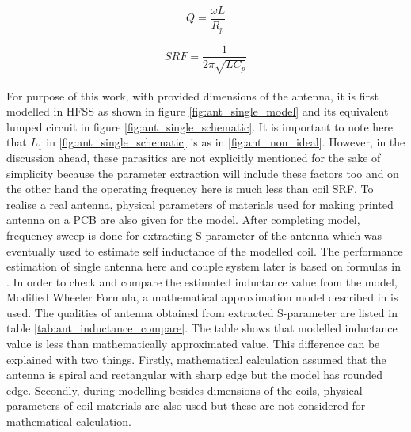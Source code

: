 \documentclass[12pt,a4paper,UKenglish]{report}
\begin{document}
\begin{equation} \label{eq:quality_f} %
Q = \frac {\omega L}{R_{p}}
\end{equation}

\begin{equation} \label{eq:srf}	%
SRF = \frac{1} {2\pi\sqrt{LC_{p}}}
\end{equation}\\

For purpose of this work, with provided dimensions of the antenna, it is first modelled in HFSS as shown in 
figure \ref{fig:ant_single_model} and its equivalent lumped circuit in figure \ref{fig:ant_single_schematic}. 
It is important to note here that $L_{1}$ in \ref{fig:ant_single_schematic} is as in \ref{fig:ant_non_ideal}. However, in the discussion ahead, these 
parasitics are not explicitly mentioned for the sake of simplicity because the parameter extraction will include these factors too and on the other hand the operating frequency here is much less than coil SRF. To realise a real antenna, physical parameters of materials used for making 
printed antenna on a PCB are also given for the model.  After completing model, frequency sweep is done for extracting S parameter of the 
antenna which was eventually used to estimate  self inductance of the modelled coil. The performance estimation of 
single antenna here and couple system later is based on formulas in \cite{ant_SZ_formula}. In order to check and compare the estimated inductance value from 
the model, Modified Wheeler Formula, a mathematical approximation model described in \cite{ant_inductance_calculation} is used. The 
qualities of antenna obtained from extracted S-parameter are listed in table \ref{tab:ant_inductance_compare}. The table shows that 
modelled inductance value is less than mathematically approximated value. This difference can be explained with two things. 
Firstly, mathematical calculation assumed that the antenna is spiral and rectangular with sharp edge but the model has 
rounded edge. Secondly, during modelling besides dimensions of the coils, physical parameters of coil materials are also used 
but these are not considered for mathematical calculation.\\
\end{document}
